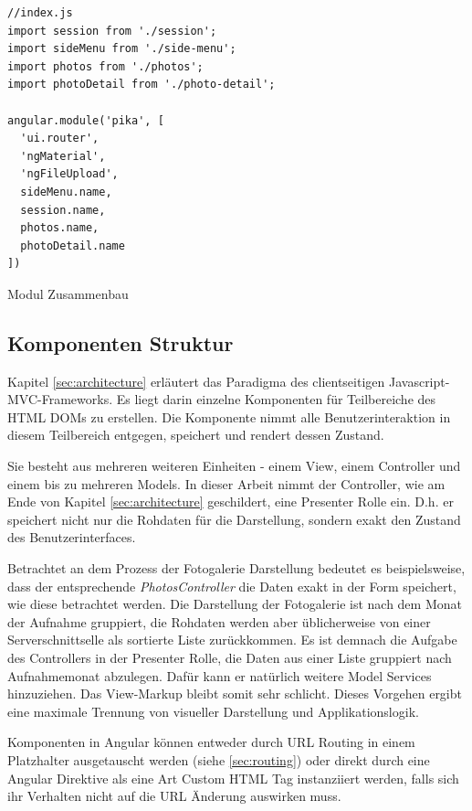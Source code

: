 \begin{listing}[H]
\begin{verbatim}
//index.js
import session from './session';
import sideMenu from './side-menu';
import photos from './photos';
import photoDetail from './photo-detail';

angular.module('pika', [
  'ui.router',
  'ngMaterial',
  'ngFileUpload',
  sideMenu.name,
  session.name,
  photos.name,
  photoDetail.name
])
\end{verbatim}
\caption{Modul Zusammenbau}
\label{lst:module_build}
\end{listing}

\subsection{Komponenten Struktur}

Kapitel \ref{sec:architecture} erläutert das Paradigma des clientseitigen Javascript-MVC-Frameworks. Es liegt darin einzelne Komponenten für Teilbereiche des HTML DOMs zu erstellen. Die Komponente nimmt alle Benutzerinteraktion in diesem Teilbereich entgegen, speichert und rendert dessen Zustand.

Sie besteht aus mehreren weiteren Einheiten - einem View, einem Controller und einem bis zu mehreren Models. In dieser Arbeit nimmt der Controller, wie am Ende von  Kapitel \ref{sec:architecture} geschildert, eine Presenter Rolle ein. D.h. er speichert nicht nur die Rohdaten für die Darstellung, sondern exakt den Zustand des Benutzerinterfaces.

Betrachtet an dem Prozess der Fotogalerie Darstellung bedeutet es beispielsweise, dass der entsprechende \textit{PhotosController} die Daten exakt in der Form speichert, wie diese betrachtet werden. Die Darstellung der Fotogalerie ist nach dem Monat der Aufnahme gruppiert, die Rohdaten werden aber üblicherweise von einer Serverschnittselle als sortierte Liste zurückkommen. Es ist demnach die Aufgabe des Controllers in der Presenter Rolle, die Daten aus einer Liste gruppiert nach Aufnahmemonat abzulegen. Dafür kann er natürlich weitere Model Services hinzuziehen. Das View-Markup bleibt somit sehr schlicht. Dieses Vorgehen ergibt eine maximale Trennung von visueller Darstellung und Applikationslogik.

Komponenten in Angular können entweder durch URL Routing in einem Platzhalter ausgetauscht werden (siehe \ref{sec:routing}) oder direkt durch eine Angular Direktive als eine Art Custom HTML Tag instanziiert werden, falls sich ihr Verhalten nicht auf die URL Änderung auswirken muss.

